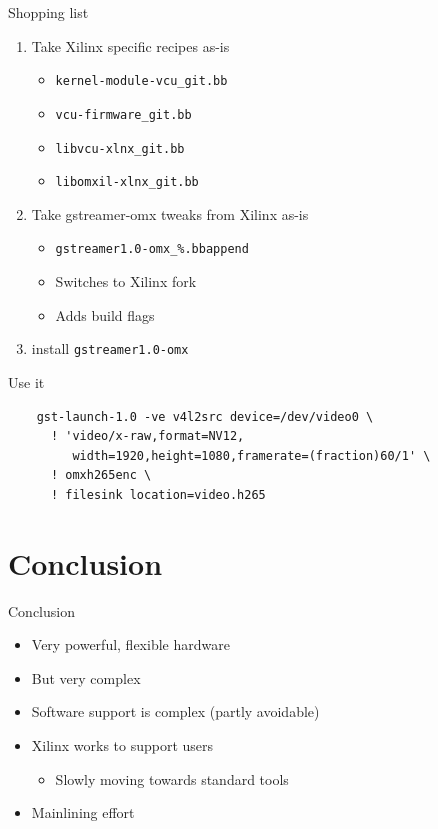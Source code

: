 \documentclass[xetex,table]{beamer}
\begin{document}
\begin{frame}{Shopping list}
  \begin{enumerate}
  \item Take Xilinx specific recipes as-is
    \begin{itemize}
    \item {\tt kernel-module-vcu\_git.bb}
    \item {\tt vcu-firmware\_git.bb}
    \item {\tt libvcu-xlnx\_git.bb}
    \item {\tt libomxil-xlnx\_git.bb}
    \end{itemize}
  \item Take gstreamer-omx tweaks from Xilinx as-is
    \begin{itemize}
    \item {\tt gstreamer1.0-omx\_\%.bbappend}
    \item Switches to Xilinx fork
    \item Adds build flags
    \end{itemize}
  \item install {\tt gstreamer1.0-omx}
  \end{enumerate}
\end{frame}

\begin{frame}[fragile]{Use it}
  \begin{verbatim}
    gst-launch-1.0 -ve v4l2src device=/dev/video0 \
      ! 'video/x-raw,format=NV12,
         width=1920,height=1080,framerate=(fraction)60/1' \
      ! omxh265enc \
      ! filesink location=video.h265
  \end{verbatim}
\end{frame}

\section{Conclusion}

\begin{frame}{Conclusion}
  \begin{itemize}
  \item Very powerful, flexible hardware
  \item But very complex
  \item Software support is complex (partly avoidable)
  \item Xilinx works to support users
    \begin{itemize}
    \item Slowly moving towards standard tools
    \end{itemize}
  \item Mainlining effort
  \end{itemize}
\end{frame}
\end{document}
